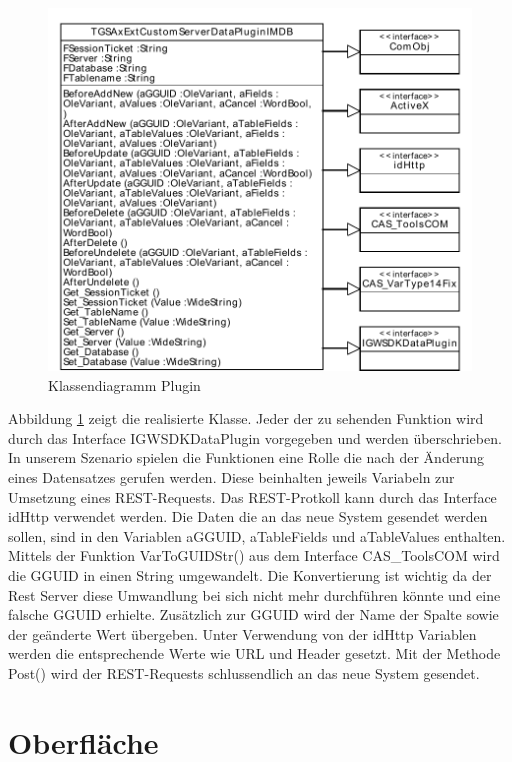 \begin{figure}[htbp]
\centering
\includegraphics[scale=0.8]{pics/plugin_klassendiagramm.pdf}
\caption{Klassendiagramm Plugin}
\label{ergebniss_plugin_klassendiagramm}
\end{figure}

Abbildung \ref{ergebniss_plugin_klassendiagramm} zeigt die realisierte Klasse. Jeder der zu sehenden Funktion wird durch das Interface IGWSDKDataPlugin vorgegeben und werden überschrieben. In unserem Szenario spielen die Funktionen eine Rolle die nach der Änderung eines Datensatzes gerufen werden. Diese beinhalten jeweils Variabeln zur Umsetzung eines REST-Requests. Das REST-Protkoll kann durch das Interface idHttp verwendet werden. Die Daten die an das neue System gesendet werden sollen, sind in den Variablen aGGUID, aTableFields und aTableValues enthalten. Mittels der Funktion VarToGUIDStr() aus dem Interface CAS\_ToolsCOM wird die GGUID in einen String umgewandelt. Die Konvertierung ist wichtig da der Rest Server diese Umwandlung bei sich nicht mehr durchführen könnte und eine falsche GGUID erhielte. Zusätzlich zur GGUID wird der Name der Spalte sowie der geänderte Wert übergeben. Unter Verwendung von der idHttp Variablen werden die entsprechende Werte wie URL und Header gesetzt. Mit der Methode Post() wird der REST-Requests schlussendlich an das neue System gesendet. 

\section{Oberfläche}

